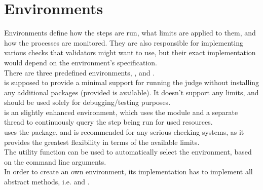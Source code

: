 \section{Environments}\label{sec:environments}
    Environments define how the steps are run, what limits are applied to them, and how the processes are monitored.
    They are also responsible for implementing various checks that validators might want to use, but their exact
    implementation would depend on the environment's specification.\\

    There are three predefined environments, \hyperref[sec:LocalComputer]{},
    \hyperref[sec:PsutilEnvironment]{} and
    \hyperref[sec:KolejkaObserver]{}.\\

    \hyperref[sec:LocalComputer]{} is supposed to provide a minimal support for running the judge
    without installing any additional packages (provided  is available).
    It doesn't support any limits, and should be used solely for debugging/testing purposes.\\

    \hyperref[sec:PsutilEnvironment]{} is an slightly enhanced environment, which uses the
     module and a separate thread to continuously query the step being run for used resources.\\

    \hyperref[sec:KolejkaObserver]{} uses the  package, and is
    recommended for any serious checking systems, as it provides the greatest flexibility in terms of the available
    limits.\\

    The utility function \hyperref[sec:detect_environment]{} can be used to
    automatically select the environment, based on the command line arguments.\\

    In order to create an own environment, its implementation has to implement all abstract methods, i.e.
    \hyperref[sec:run_command]{} and
    \hyperref[sec:format_execution_status]{}.\\

\subsection*{}

